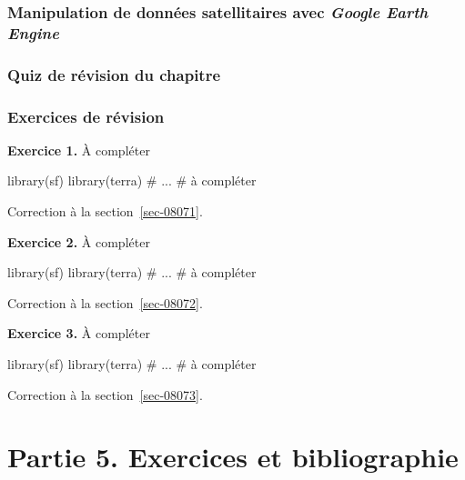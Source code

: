 \documentclass[
  letterpaper,
  DIV=11,
  numbers=noendperiod]{scrreprt}
\newenvironment{Shaded}{\begin{snugshade}}{\end{snugshade}}
\newcommand{\CommentTok}[1]{\textcolor[rgb]{0.37,0.37,0.37}{#1}}
\newcommand{\NormalTok}[1]{\textcolor[rgb]{0.00,0.23,0.31}{#1}}
\begin{document}
\section{\texorpdfstring{Manipulation de données satellitaires avec
\emph{Google Earth
Engine}}{Manipulation de données satellitaires avec Google Earth Engine}}\label{sec-072}

\section{Quiz de révision du chapitre}\label{sec-073}

\section{Exercices de révision}\label{sec-074}

\textbf{Exercice 1.} À compléter

\begin{Shaded}
\begin{Highlighting}[]
\NormalTok{library(sf)}
\NormalTok{library(terra)}
\CommentTok{\# ...}
\CommentTok{\# à compléter}
\end{Highlighting}
\end{Shaded}

Correction à la section~\ref{sec-08071}.

\textbf{Exercice 2.} À compléter

\begin{Shaded}
\begin{Highlighting}[]
\NormalTok{library(sf)}
\NormalTok{library(terra)}
\CommentTok{\# ...}
\CommentTok{\# à compléter}
\end{Highlighting}
\end{Shaded}

Correction à la section~\ref{sec-08072}.

\textbf{Exercice 3.} À compléter

\begin{Shaded}
\begin{Highlighting}[]
\NormalTok{library(sf)}
\NormalTok{library(terra)}
\CommentTok{\# ...}
\CommentTok{\# à compléter}
\end{Highlighting}
\end{Shaded}

Correction à la section~\ref{sec-08073}.

\part{Partie 5. Exercices et bibliographie}
\end{document}
